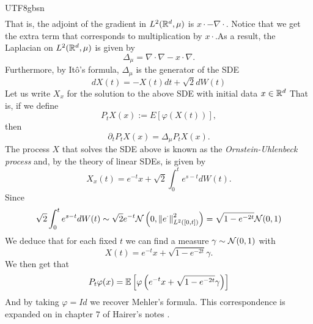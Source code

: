 \documentclass[12pt]{article}
\begin{document}
\begin{CJK*}{UTF8}{gbsn}
\begin{align*}
	\end{align*}
	That is, the adjoint of the gradient in $L^2({\mathbb R}^d,\mu )$ is $x\cdot -\nabla\cdot $. Notice that we get the extra term that corresponds to multiplication by $x\cdot $.As a result, the Laplacian on $L^2({\mathbb R}^d, \mu )$ is given by
	\begin{equation*}
		\Delta_\mu =\nabla\cdot \nabla-x\cdot \nabla .
	\end{equation*}
	Furthermore, by Itô's formula, $\Delta_\mu $ is the generator of the SDE
	\begin{equation*}
		dX(t)=-X(t)d t+ \sqrt{2}dW(t)
	\end{equation*}
	Let us write $X_x$ for the solution to the above SDE with initial data  $x \in {\mathbb R}^d$
	That is, if we define $$P_tX(x):=E[\varphi(X(t))],$$ then
	\begin{equation*}
		\partial _tP_tX(x)=\Delta_\mu P_tX(x) .
	\end{equation*}
	The process $X$ that solves the SDE above is known as the \emph{Ornstein-Uhlenbeck process} and, by the theory of linear SDEs, is given by
	\begin{equation*}
		X_x(t)=e^{-t}x+\sqrt{2} \int_{0}^te^{s-t} dW(t).
	\end{equation*}
	Since
	\begin{equation*}
		\sqrt{2} \int_{0}^te^{s-t} dW(t)\sim \sqrt{2} e^{-t}\mathcal{N}\left(0,\norm{e^\cdot }^2_{L^2([0,t])}\right)=\sqrt{1-e^{-2t}}\mathcal{N}(0,1)
	\end{equation*}
	We deduce that for each fixed $t$ we can find a measure $\gamma   \sim \mathcal{N}(0,1)$ with
	\begin{equation*}
		X(t)=e^{-t}x+\sqrt{1-e^{-2t}}\gamma .
	\end{equation*}
	We then get that
	\begin{equation*}
		P_t \varphi(x)=\mathbb{E}\left[\varphi\left(e^{-t}x+\sqrt{1-e^{-2t}}\gamma  \right)\right]
	\end{equation*}
	And by taking $\varphi=Id$ we recover Mehler's formula. This correspondence is expanded on in chapter $7$ of Hairer's notes \cite{hairer2009introduction}.
\end{CJK*}




\end{document}
